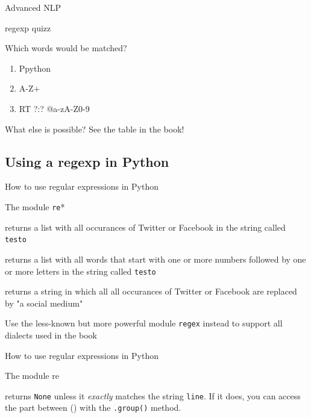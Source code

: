 \documentclass[compress]{beamer}
\begin{document}
\begin{section}{Advanced NLP}
\begin{frame}{regexp quizz}
\begin{block}{Which words would be matched?}
\tt
\begin{enumerate}
\item<1-> \lbrack Pp\rbrack ython
\item<2-> \lbrack A-Z\rbrack +
\item<3-> RT ?:? @\lbrack a-zA-Z0-9\rbrack *
\end{enumerate}
\end{block}
\end{frame}

\begin{frame}{What else is possible?}
See the table in the book!
\end{frame}

\subsection{Using a regexp in Python}
\begin{frame}{How to use regular expressions in Python}
\begin{block}{The module \texttt{re}*}
\begin{description}
\item<1->[{\tt{re.findall("\lbrack Tt\rbrack witter|\lbrack Ff\rbrack acebook",testo)}}] returns a list with all occurances of Twitter or Facebook in the string called {\tt{testo}}
\item<1->[{\tt{re.findall("\lbrack 0-9\rbrack +\lbrack a-zA-Z\rbrack +",testo)}}] returns a list with all words that start with one or more numbers followed by one or more letters in the string called {\tt{testo}}
\item<2->[{\tt{re.sub("\lbrack Tt\rbrack witter|\lbrack Ff\rbrack acebook","a social medium",testo)}}] returns a string in which all all occurances of Twitter or Facebook are replaced by "a social medium"
\end{description}
\end{block}

\tiny{Use the less-known but more powerful module \texttt{regex} instead to support all dialects used in the book}
\end{frame}


\begin{frame}[fragile]{How to use regular expressions in Python}
\begin{block}{The module re}
\begin{description}
\item<1->[{\tt{re.match(" +(\lbrack 0-9\rbrack +) of (\lbrack 0-9\rbrack +) points",line)}}] returns  \texttt{None} unless it \emph{exactly} matches the string \texttt{line}. If it does, you can access the part between () with the \texttt{.group()} method.
\end{description}
\end{block}


\end{frame}
\end{section}
\end{document}
